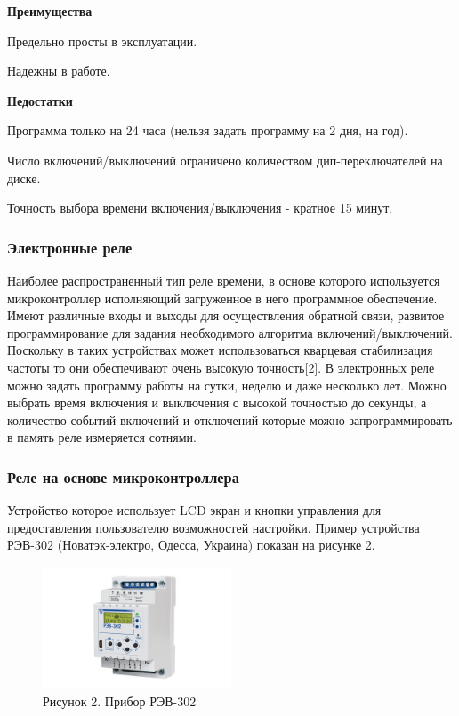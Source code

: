 \textbf{Преимущества}
\begin{my_enumerate}
\item Предельно просты в эксплуатации.
\item Надежны в работе.
\end{my_enumerate}

\textbf{Недостатки}
\begin{my_enumerate}
\item Программа только на 24 часа (нельзя задать программу на 2 дня, на год).
\item Число включений/выключений ограничено количеством дип-переключателей на диске.
\item Точность выбора времени включения/выключения - кратное 15 минут.
\end{my_enumerate}


\subsubsection{Электронные реле}
Наиболее распространенный тип реле времени, в основе которого используется микроконтроллер исполняющий загруженное в него программное обеспечение. Имеют различные входы и выходы для осуществления обратной связи, развитое программирование для задания необходимого алгоритма включений/выключений.  Поскольку в таких устройствах может использоваться кварцевая стабилизация частоты то они обеспечивают очень высокую точность[2]. В электронных реле можно задать программу работы на сутки, неделю и даже несколько лет. Можно выбрать время включения и выключения с высокой точностью до секунды, а количество событий включений и отключений которые можно запрограммировать в память реле измеряется сотнями. 

\subsubsection*{Реле на основе микроконтроллера}

Устройство которое использует LCD экран и кнопки управления для предоставления пользователю возможностей настройки.
Пример устройства РЭВ-302 (Новатэк-электро, Одесса, Украина) показан на рисунке 2.

\begin{figure}[h!]
    \centering
    \includegraphics[width=0.5\textwidth]{rev302.png}
    \caption{Рисунок 2. Прибор РЭВ-302}
\end{figure}


